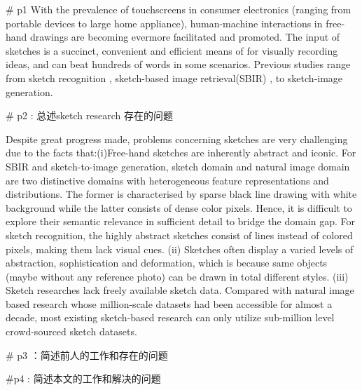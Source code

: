 



# p1
{W}{ith} the prevalence of touchscreens in consumer electronics (ranging from portable devices to large home appliance),
 human-machine interactions in free-hand drawings are becoming evermore facilitated and promoted. 
 The input of sketches is a succinct, convenient and efficient means of for visually recording ideas, and can beat hundreds of words in some scenarios. 
 Previous studies range from sketch recognition
  \cite{sketchanet}, sketch-based image retrieval(SBIR) \cite{SaavedraB10,2012sketchhash,Yu2016shoes,SangkloyBHH16,SongYSXH17,EitzHBA10},
  to sketch-image generation. 

# p2 : 总述sketch research 存在的问题

Despite great progress made, problems concerning sketches are very challenging due to the facts that:(i)Free-hand sketches are inherently abstract and iconic.
For SBIR and sketch-to-image generation, sketch domain and natural image domain are two distinctive domains with heterogeneous feature representations and distributions. The former is characterised by 
sparse black line drawing with white background while the latter consists of dense color pixels. Hence, it is difficult to explore their semantic 
relevance in sufficient detail to bridge the domain gap. For sketch recognition, the highly abstract sketches consist of lines instead of colored pixels, making them lack visual cues.
(ii) Sketches often display a varied levels of abstraction, sophistication and deformation, which is because same objects (maybe without any reference photo) can be drawn in total different styles. 
(iii) Sketch researches lack freely available sketch data. Compared with natural image based research whose million-scale datasets had been accessible for almost a decade, most existing 
sketch-based research can only utilize sub-million level crowd-sourced sketch datasets.

# p3 ：简述前人的工作和存在的问题

#p4 : 简述本文的工作和解决的问题